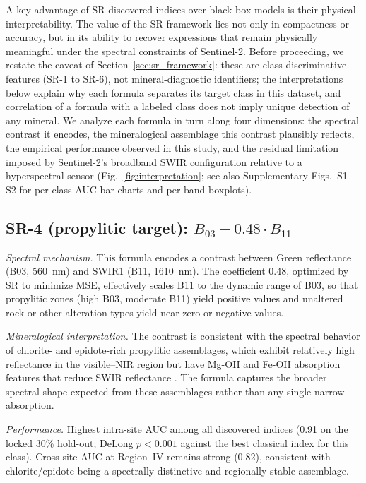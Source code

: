 \documentclass[preprint,authoryear,number]{elsarticle}
\begin{document}
A key advantage of SR-discovered indices over black-box models is their physical interpretability. The value of the SR framework lies not only in compactness or accuracy, but in its ability to recover expressions that remain physically meaningful under the spectral constraints of Sentinel-2. Before proceeding, we restate the caveat of Section~\ref{sec:sr_framework}: these are class-discriminative features (SR-1 to SR-6), not mineral-diagnostic identifiers; the interpretations below explain why each formula separates its target class in this dataset, and correlation of a formula with a labeled class does not imply unique detection of any mineral. We analyze each formula in turn along four dimensions: the spectral contrast it encodes, the mineralogical assemblage this contrast plausibly reflects, the empirical performance observed in this study, and the residual limitation imposed by Sentinel-2's broadband SWIR configuration relative to a hyperspectral sensor (Fig.~\ref{fig:interpretation}; see also Supplementary Figs.~S1--S2 for per-class AUC bar charts and per-band boxplots).

\subsection{SR-4 (propylitic target): $B_{03} - 0.48 \cdot B_{11}$}

\emph{Spectral mechanism.} This formula encodes a contrast between Green reflectance (B03, \SI{560}{\nano\meter}) and SWIR1 (B11, \SI{1610}{\nano\meter}). The coefficient 0.48, optimized by SR to minimize MSE, effectively scales B11 to the dynamic range of B03, so that propylitic zones (high B03, moderate B11) yield positive values and unaltered rock or other alteration types yield near-zero or negative values.

\emph{Mineralogical interpretation.} The contrast is consistent with the spectral behavior of chlorite- and epidote-rich propylitic assemblages, which exhibit relatively high reflectance in the visible--NIR region but have Mg-OH and Fe-OH absorption features that reduce SWIR reflectance \citep{Hunt1977,Clark1999}. The formula captures the broader spectral shape expected from these assemblages rather than any single narrow absorption.

\emph{Performance.} Highest intra-site AUC among all discovered indices (0.91 on the locked 30\% hold-out; DeLong $p < 0.001$ against the best classical index for this class). Cross-site AUC at Region~IV remains strong (0.82), consistent with chlorite/epidote being a spectrally distinctive and regionally stable assemblage.
\end{document}
